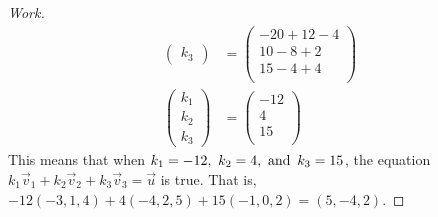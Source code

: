 \documentclass{article}
\begin{document}
\begin{proof}[Work]
\begin{align*}
\begin{pmatrix}
            k_3
        \end{pmatrix} & =
        \begin{pmatrix}
            -20 + 12 - 4 \\
            10 - 8 + 2   \\
            15 - 4 + 4   \\
        \end{pmatrix}    \\
        \begin{pmatrix}
            k_1 \\
            k_2 \\
            k_3
        \end{pmatrix} & =
        \begin{pmatrix}
            -12 \\
            4   \\
            15  \\
        \end{pmatrix}
    \end{align*}
    This means that when $k_1 = -12,~k_2 = 4, \operatorname{~\text{and}~} k_3 = 15$, the equation $k_1\vec{v}_1 + k_2\vec{v}_2 + k_3\vec{v}_3 = \vec{u}$ is true. That is, $-12(-3,1,4) + 4(-4,2,5) + 15(-1,0,2) = (5,-4,2)$.
\end{proof}
\qdash
\end{document}
